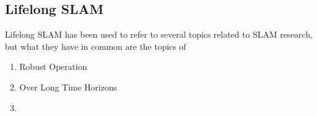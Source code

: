 \subsection{Lifelong SLAM}

Lifelong SLAM has been used to refer to several topics related to SLAM research, but what they have in common are the topics of
\begin{enumerate}
    \item Robust Operation
    \item Over Long Time Horizons
    \item 
\end{enumerate}